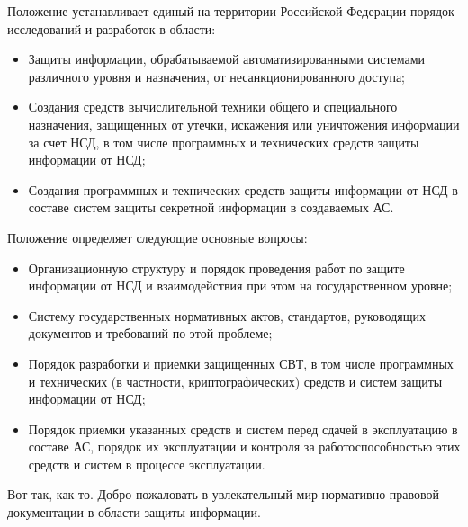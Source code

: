 Положение устанавливает единый на территории Российской Федерации порядок исследований и разработок в области:
\begin{itemize}
	\item Защиты информации, обрабатываемой автоматизированными системами различного уровня и назначения, от несанкционированного доступа;
	\item Создания средств вычислительной техники общего и специального назначения, защищенных от утечки, искажения или уничтожения информации за счет НСД, в том числе программных и технических средств защиты информации от НСД;
	\item Создания программных и технических средств защиты информации от НСД в составе систем защиты секретной информации в создаваемых АС.
\end{itemize}
Положение определяет следующие основные вопросы:
\begin{itemize}
	\item Организационную структуру и порядок проведения работ по защите информации от НСД и взаимодействия при этом на государственном уровне;
	\item Систему государственных нормативных актов, стандартов, руководящих документов и требований по этой проблеме;
	\item Порядок разработки и приемки защищенных СВТ, в том числе программных и технических (в частности, криптографических) средств и систем защиты информации от НСД;
	\item Порядок приемки указанных средств и систем перед сдачей в эксплуатацию в составе АС, порядок их эксплуатации и контроля за работоспособностью этих средств и систем в процессе эксплуатации.
\end{itemize}

Вот так, как-то. Добро пожаловать в увлекательный мир нормативно-правовой документации в области защиты информации.










